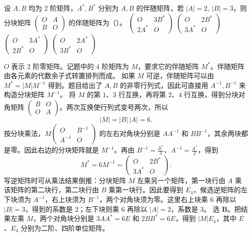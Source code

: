 \documentclass[UTF8,zihao=-4,fontset=fandol]{ctexart}
\begin{document}

设 $A,B$ 均为 $2$ 阶矩阵，$A^*,B^*$ 分别为 $A,B$ 的伴随矩阵，若 $|A|=2,\ |B|=3$，则分块矩阵 $\begin{pmatrix}O&A\\ B&O\end{pmatrix}$ 的伴随矩阵为（\quad）。
\Choices
  {$\begin{pmatrix}O&3B^*\\2A^*&O\end{pmatrix}$}
  {$\begin{pmatrix}O&2B^*\\3A^*&O\end{pmatrix}$}
  {$\begin{pmatrix}O&3A^*\\2B^*&O\end{pmatrix}$}
  {$\begin{pmatrix}O&2A^*\\3B^*&O\end{pmatrix}$}

\Solution
\Known $O$ 表示 $2$ 阶零矩阵。记题中的 $4$ 阶矩阵为 $M$，要求它的伴随矩阵 $M^*$。伴随矩阵由各元素的代数余子式转置排列而成。
\Method 如果 $M$ 可逆，伴随矩阵可以由 $M^*=|M|M^{-1}$ 得到。题目给出了 $A,B$ 的非零行列式，因此可直接用 $A^{-1},B^{-1}$ 来构造分块矩阵 $M^{-1}$。
\Derive 将 $M$ 的第 $1$、$3$ 行互换，再将第 $2$、$4$ 行互换，得到分块对角矩阵 $\begin{pmatrix}B&O\\O&A\end{pmatrix}$。两次互换使行列式变号两次，所以
\[
|M|=|B|\,|A|=6.
\]
按分块乘法，$M\begin{pmatrix}O&B^{-1}\\A^{-1}&O\end{pmatrix}$ 的左右对角块分别是 $AA^{-1}$ 和 $BB^{-1}$，其余两块都是零。因此右边的分块矩阵就是 $M^{-1}$。再由 $B^{-1}=\frac{B^*}{3}$、$A^{-1}=\frac{A^*}{2}$，得到
\[
M^*=6M^{-1}=\begin{pmatrix}O&2B^*\\3A^*&O\end{pmatrix}.
\]
写逆矩阵时可从乘法结果倒推：分块矩阵 $M$ 左乘另一个矩阵，第一块行由 $A$ 乘该矩阵的第二块行，第二块行由 $B$ 乘第一块行。因此要得到 $E_4$，候选逆矩阵的左下块须为 $A^{-1}$，右上块须为 $B^{-1}$，两个对角块须为零。这里右上块乘 $6$ 再除以 $|B|=3$，得到的系数是 $2$；左下块则乘 $6$ 再除以 $|A|=2$，系数是 $3$。
\Verify 选 \textbf{B}。把结果左乘 $M$，两个对角块分别是 $3AA^*=6E$ 和 $2BB^*=6E$，得到 $|M|E_4$，其中 $E$、$E_4$ 分别为二阶、四阶单位矩阵。
\end{document}
